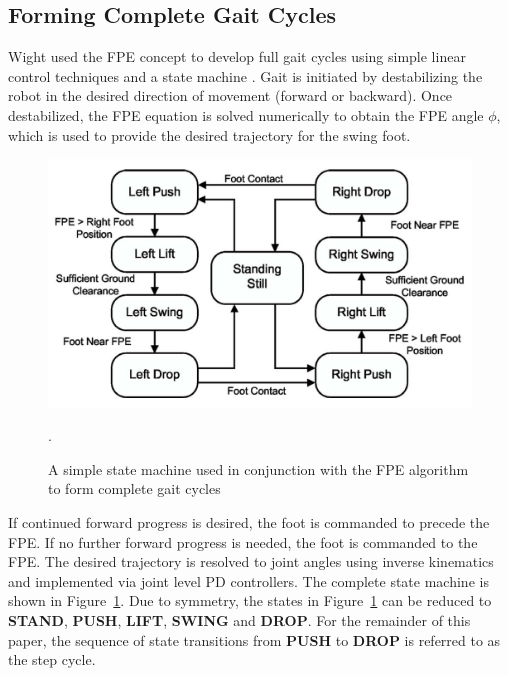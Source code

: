 
\subsection{Forming Complete Gait Cycles} %
\label{sub:gait_cycles}
Wight used the FPE concept to develop full gait cycles using simple linear control techniques and a state machine \cite{Wight:2008vt}. Gait is initiated by destabilizing the robot in the desired direction of movement (forward or backward). Once destabilized, the FPE equation is solved numerically to obtain the FPE angle $\phi$, which is used to provide the desired trajectory for the swing foot. 

\begin{figure}[!h]
	\centering
    \includegraphics[scale=0.4]{fig/simulations/fpestatemachine.png}
  	\caption{A simple state machine used in conjunction with the FPE algorithm to form complete gait cycles}.
	\label{fig:statemachine}
\end{figure}

If continued forward progress is desired, the foot is commanded to precede the FPE. If no further forward progress is needed, the foot is commanded to the FPE. The desired trajectory is resolved to joint angles using inverse kinematics and implemented via joint level PD controllers. The complete state machine is shown in Figure~\ref{fig:statemachine}. Due to symmetry, the states in Figure~\ref{fig:statemachine} can be reduced to \textbf{STAND}, \textbf{PUSH}, \textbf{LIFT}, \textbf{SWING} and \textbf{DROP}. For the remainder of this paper, the sequence of state transitions from \textbf{PUSH} to \textbf{DROP} is referred to as the step cycle.


